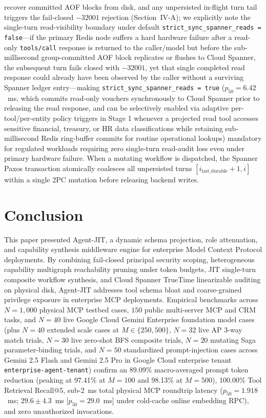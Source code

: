 \documentclass[conference,10pt]{IEEEtran}
\begin{document}
\begin{itemize}
recover committed AOF blocks from disk, and any unpersisted in-flight turn tail triggers the fail-closed $-32001$ rejection (Section~IV-A); we explicitly note the single-turn read-visibility boundary under default \texttt{strict\_sync\_spanner\_reads = false}---if the primary Redis node suffers a hard hardware failure after a read-only \texttt{tools/call} response is returned to the caller/model but before the sub-millisecond group-committed AOF block replicates or flushes to Cloud Spanner, the subsequent turn fails closed with $-32001$, yet that single completed read response could already have been observed by the caller without a surviving Spanner ledger entry---making \texttt{strict\_sync\_spanner\_reads = true} ($p_{50} = 6.42$~ms, which commits read-only vouchers synchronously to Cloud Spanner prior to releasing the read response, and can be selectively enabled via adaptive per-tool/per-entity policy triggers in Stage 1 whenever a projected read tool accesses sensitive financial, treasury, or HR data classifications while retaining sub-millisecond Redis ring-buffer commits for routine operational lookups) mandatory for regulated workloads requiring zero single-turn read-audit loss even under primary hardware failure. When a mutating workflow is dispatched, the Spanner Paxos transaction atomically coalesces all unpersisted turns $[i_{\text{last\_durable}} + 1, i]$ within a single 2PC mutation before releasing backend writes.
\end{itemize}

\section{Conclusion}
This paper presented Agent-JIT, a dynamic schema projection, role attenuation, and capability synthesis middleware engine for enterprise Model Context Protocol deployments. By combining fail-closed principal security scoping, heterogeneous capability multigraph reachability pruning under token budgets, JIT single-turn composite workflow synthesis, and Cloud Spanner TrueTime linearizable auditing on physical disk, Agent-JIT addresses tool schema bloat and coarse-grained privilege exposure in enterprise MCP deployments. Empirical benchmarks across $N = 1{,}000$ physical MCP testbed cases, $150$ public multi-server MCP and CRM tasks, and $N = 40$ live Google Cloud Gemini Enterprise foundation model cases (plus $N = 40$ extended scale cases at $M \in \{250, 500\}$, $N = 32$ live AP 3-way match trials, $N = 30$ live zero-shot BFS composite trials, $N = 20$ mutating Saga parameter-binding trials, and $N = 50$ standardized prompt-injection cases across Gemini 2.5 Flash and Gemini 2.5 Pro in Google Cloud enterprise tenant \texttt{enterprise-agent-tenant}) confirm an 89.09\% macro-averaged prompt token reduction (peaking at 97.41\% at $M=100$ and 98.13\% at $M=500$), 100.00\% Tool Retrieval Recall@5, sub-2~ms total physical MCP roundtrip latency ($p_{50} = 1.918$~ms; $29.6 \pm 4.3$~ms [$p_{50} = 29.0$~ms] under cold-cache online embedding RPC), and zero unauthorized invocations.
\end{document}
